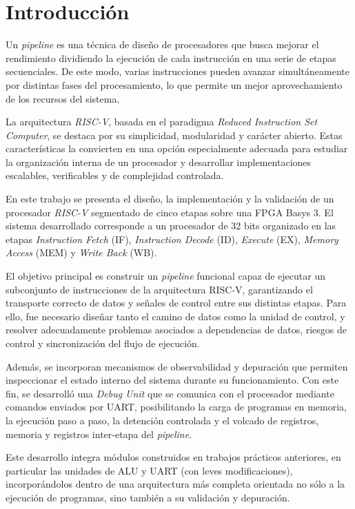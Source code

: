 \newpage

\section{Introducción}

Un \textit{pipeline} es una técnica de diseño de procesadores que busca mejorar el rendimiento dividiendo la ejecución de cada instrucción en una serie de etapas secuenciales. De este modo, varias instrucciones pueden avanzar simultáneamente por distintas fases del procesamiento, lo que permite un mejor aprovechamiento de los recursos del sistema.

La arquitectura \textit{RISC-V}, basada en el paradigma \textit{Reduced Instruction Set Computer}, se destaca por su simplicidad, modularidad y carácter abierto. Estas características la convierten en una opción especialmente adecuada para estudiar la organización interna de un procesador y desarrollar implementaciones escalables, verificables y de complejidad controlada.

En este trabajo se presenta el diseño, la implementación y la validación de un procesador \textit{RISC-V} segmentado de cinco etapas sobre una FPGA Basys 3. El sistema desarrollado corresponde a un procesador de 32 bits organizado en las etapas \textit{Instruction Fetch} (IF), \textit{Instruction Decode} (ID), \textit{Execute} (EX), \textit{Memory Access} (MEM) y \textit{Write Back} (WB).

El objetivo principal es construir un \textit{pipeline} funcional capaz de ejecutar un subconjunto de instrucciones de la arquitectura RISC-V, garantizando el transporte correcto de datos y señales de control entre sus distintas etapas. Para ello, fue necesario diseñar tanto el camino de datos como la unidad de control, y resolver adecuadamente problemas asociados a dependencias de datos, riesgos de control y sincronización del flujo de ejecución.

Además, se incorporan mecanismos de observabilidad y depuración que permiten inspeccionar el estado interno del sistema durante su funcionamiento. Con este fin, se desarrolló una \textit{Debug Unit} que se comunica con el procesador mediante comandos enviados por UART, posibilitando la carga de programas en memoria, la ejecución paso a paso, la detención controlada y el volcado de registros, memoria y registros inter-etapa del \textit{pipeline}.

Este desarrollo integra módulos construidos en trabajos prácticos anteriores, en particular las unidades de ALU y UART (con leves modificaciones), incorporándolos dentro de una arquitectura más completa orientada no sólo a la ejecución de programas, sino también a su validación y depuración.
